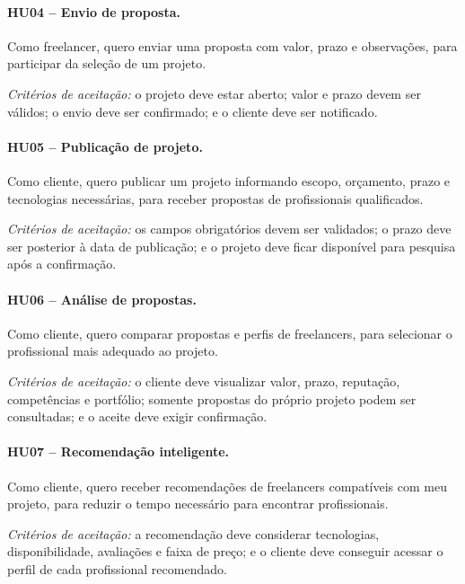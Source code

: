 \documentclass[portuguese]{sbcreviews-2025}
\begin{document}
\paragraph{HU04 -- Envio de proposta.}

Como freelancer, quero enviar uma proposta com valor, prazo e
observações, para participar da seleção de um projeto.

\textit{Critérios de aceitação:} o projeto deve estar aberto; valor
e prazo devem ser válidos; o envio deve ser confirmado; e o cliente
deve ser notificado.

\paragraph{HU05 -- Publicação de projeto.}

Como cliente, quero publicar um projeto informando escopo, orçamento,
prazo e tecnologias necessárias, para receber propostas de
profissionais qualificados.

\textit{Critérios de aceitação:} os campos obrigatórios devem ser
validados; o prazo deve ser posterior à data de publicação; e o
projeto deve ficar disponível para pesquisa após a confirmação.

\paragraph{HU06 -- Análise de propostas.}

Como cliente, quero comparar propostas e perfis de freelancers, para
selecionar o profissional mais adequado ao projeto.

\textit{Critérios de aceitação:} o cliente deve visualizar valor,
prazo, reputação, competências e portfólio; somente propostas do
próprio projeto podem ser consultadas; e o aceite deve exigir
confirmação.

\paragraph{HU07 -- Recomendação inteligente.}

Como cliente, quero receber recomendações de freelancers compatíveis
com meu projeto, para reduzir o tempo necessário para encontrar
profissionais.

\textit{Critérios de aceitação:} a recomendação deve considerar
tecnologias, disponibilidade, avaliações e faixa de preço; e o
cliente deve conseguir acessar o perfil de cada profissional
recomendado.
\end{document}
